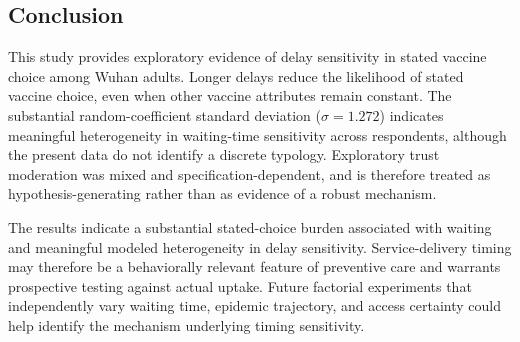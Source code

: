 \documentclass[12pt]{article}
\begin{document}
\subsection{Conclusion}

This study provides exploratory evidence of delay sensitivity in stated vaccine choice among Wuhan adults. Longer delays reduce the likelihood of stated vaccine choice, even when other vaccine attributes remain constant. The substantial random-coefficient standard deviation ($\sigma = 1.272$) indicates meaningful heterogeneity in waiting-time sensitivity across respondents, although the present data do not identify a discrete typology. Exploratory trust moderation was mixed and specification-dependent, and is therefore treated as hypothesis-generating rather than as evidence of a robust mechanism.

The results indicate a substantial stated-choice burden associated with waiting and meaningful modeled heterogeneity in delay sensitivity. Service-delivery timing may therefore be a behaviorally relevant feature of preventive care and warrants prospective testing against actual uptake. Future factorial experiments that independently vary waiting time, epidemic trajectory, and access certainty could help identify the mechanism underlying timing sensitivity.

\clearpage
\printbibliography

\end{document}
